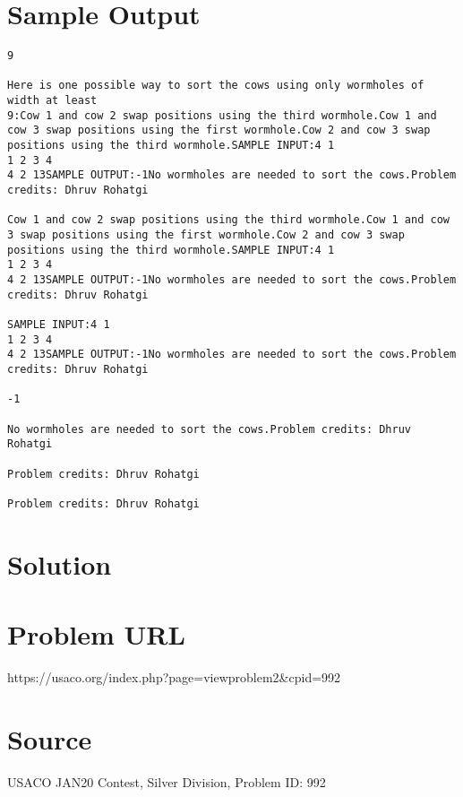 \documentclass[12pt]{article}
\begin{document}
\section*{Sample Output}
\begin{verbatim}
9

Here is one possible way to sort the cows using only wormholes of width at least
9:Cow 1 and cow 2 swap positions using the third wormhole.Cow 1 and cow 3 swap positions using the first wormhole.Cow 2 and cow 3 swap positions using the third wormhole.SAMPLE INPUT:4 1
1 2 3 4
4 2 13SAMPLE OUTPUT:-1No wormholes are needed to sort the cows.Problem credits: Dhruv Rohatgi

Cow 1 and cow 2 swap positions using the third wormhole.Cow 1 and cow 3 swap positions using the first wormhole.Cow 2 and cow 3 swap positions using the third wormhole.SAMPLE INPUT:4 1
1 2 3 4
4 2 13SAMPLE OUTPUT:-1No wormholes are needed to sort the cows.Problem credits: Dhruv Rohatgi

SAMPLE INPUT:4 1
1 2 3 4
4 2 13SAMPLE OUTPUT:-1No wormholes are needed to sort the cows.Problem credits: Dhruv Rohatgi

-1

No wormholes are needed to sort the cows.Problem credits: Dhruv Rohatgi

Problem credits: Dhruv Rohatgi

Problem credits: Dhruv Rohatgi
\end{verbatim}

\section*{Solution}


\section*{Problem URL}
https://usaco.org/index.php?page=viewproblem2&cpid=992

\section*{Source}
USACO JAN20 Contest, Silver Division, Problem ID: 992
\end{document}
